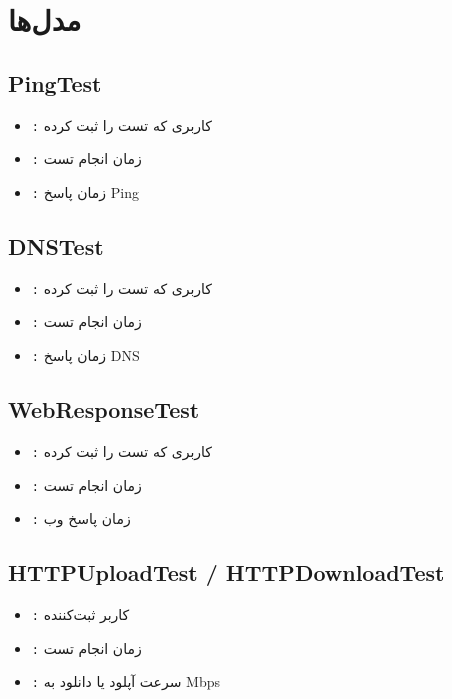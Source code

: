 \documentclass{report}
\begin{document}
\section{مدل‌ها}

\subsection{PingTest}
\begin{itemize}
    \item \texttt{:} کاربری که تست را ثبت کرده
    \item \texttt{:} زمان انجام تست
    \item \texttt{:} زمان پاسخ Ping  
\end{itemize}

\subsection{DNSTest}
\begin{itemize}
    \item \texttt{:} کاربری که تست را ثبت کرده
    \item \texttt{:} زمان انجام تست
    \item \texttt{:} زمان پاسخ DNS  
\end{itemize}

\subsection{WebResponseTest}
\begin{itemize}
    \item \texttt{:} کاربری که تست را ثبت کرده 
    \item \texttt{:} زمان انجام تست
    \item \texttt{:} زمان پاسخ وب  
\end{itemize}

\subsection{HTTPUploadTest / HTTPDownloadTest}
\begin{itemize}
    \item \texttt{:} کاربر ثبت‌کننده
    \item \texttt{:} زمان انجام تست
    \item \texttt{:} سرعت آپلود یا دانلود به Mbps
\end{itemize}
\end{document}
